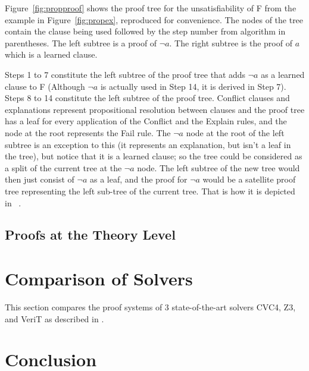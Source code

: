 \documentclass{article}
\begin{document}
Figure~\ref{fig:propproof} shows the proof tree for the 
unsatisfiability of F from the example in Figure~\ref{fig:propex}, 
reproduced for convenience. The nodes of the tree contain 
the clause being used followed by the step number from 
algorithm in parentheses. The left subtree is a proof of
$\neg a$. The right subtree is the proof of $a$ which is 
a learned clause.

Steps 1 to 7 constitute the left subtree of the proof tree that
adds $\neg a$ as a learned clause to F
(Although $\neg a$ is actually used in Step 14, 
it is derived in Step 7). Steps 8 to 14 constitute 
the left subtree of the proof tree.
Conflict clauses and explanations represent propositional resolution
between clauses and the proof tree has a leaf for every application 
of the Conflict and the Explain rules, and the node at the root 
represents the Fail rule. The $\neg a$ node at the root of the 
left subtree
is an exception to this (it represents an explanation, but isn't a leaf
in the tree), but notice that it is a learned clause; 
so the tree could be considered as a split of the current tree 
at the $\neg a$ node. The left subtree of the new tree 
would then just consist of $\neg a$ as a leaf, and the proof 
for $\neg a$ would be a satellite proof tree representing 
the left sub-tree of the current tree. That is how it is depicted 
in ~\cite{DBLP:conf/fmcad/2016}.

\subsection{Proofs at the Theory Level}
\label{sec:theoryproofs}

\section{Comparison of Solvers}
\label{sec:comp}
This section compares the proof systems of 3 state-of-the-art 
solvers CVC4, Z3, and VeriT as described in .

\section{Conclusion}
\label{sec:conc}



\end{document}
